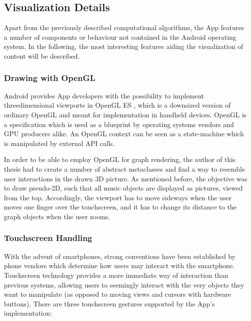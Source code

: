 \subsection{Visualization Details}

Apart from the previously described computational algorithms, the App features a number of components or behaviour not contained in the Android operating system. In the following, the most interesting features aiding the visualization of content will be described.

\subsubsection{Drawing with OpenGL}

Android provides App developers with the possibility to implement threedimensional viewports in OpenGL ES \cite{url:opengles}, which is a downsized version of ordinary OpenGL and meant for implementation in handheld devices. OpenGL is a specification which is used as a blueprint by operating systems vendors and GPU producers alike. An OpenGL context can be seen as a state-machine which is manipulated by external API calls.

In order to be able to employ OpenGL for graph rendering, the author of this thesis had to create a number of abstract metaclasses and find a way to resemble user interactions in the drawn 3D picture. As mentioned before, the objective was to draw pseudo-2D, such that all music objects are displayed as pictures, viewed from the top. Accordingly, the viewport has to move sideways when the user moves one finger over the touchscreen, and it has to change its distance to the graph objects when the user zooms.

\subsubsection{Touchscreen Handling}

With the advent of smartphones, strong conventions have been established by phone vendors which determine how users may interact with the smartphone. Touchscreen technology provides a more immediate way of interaction than previous systems, allowing users to seemingly interact with the very objects they want to manipulate (as opposed to moving views and cursors with hardware buttons).
There are three touchscreen gestures supported by the App's implementation:

